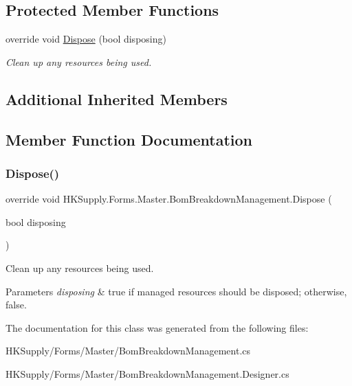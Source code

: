 \subsection*{Protected Member Functions}
\begin{DoxyCompactItemize}
\item 
override void \mbox{\hyperlink{class_h_k_supply_1_1_forms_1_1_master_1_1_bom_breakdown_management_a4a926b84f748154b3f113f4968529944}{Dispose}} (bool disposing)
\begin{DoxyCompactList}\small\item\em Clean up any resources being used. \end{DoxyCompactList}\end{DoxyCompactItemize}
\subsection*{Additional Inherited Members}


\subsection{Member Function Documentation}
\mbox{\label{class_h_k_supply_1_1_forms_1_1_master_1_1_bom_breakdown_management_a4a926b84f748154b3f113f4968529944}} 
\subsubsection{\texorpdfstring{Dispose()}{Dispose()}}
{\footnotesize\ttfamily override void H\+K\+Supply.\+Forms.\+Master.\+Bom\+Breakdown\+Management.\+Dispose (\begin{DoxyParamCaption}\item[{bool}]{disposing }\end{DoxyParamCaption})\hspace{0.3cm}{\ttfamily [protected]}}



Clean up any resources being used. 


\begin{DoxyParams}{Parameters}
{\em disposing} & true if managed resources should be disposed; otherwise, false.\\
\hline
\end{DoxyParams}


The documentation for this class was generated from the following files\+:\begin{DoxyCompactItemize}
\item 
H\+K\+Supply/\+Forms/\+Master/Bom\+Breakdown\+Management.\+cs\item 
H\+K\+Supply/\+Forms/\+Master/Bom\+Breakdown\+Management.\+Designer.\+cs\end{DoxyCompactItemize}
